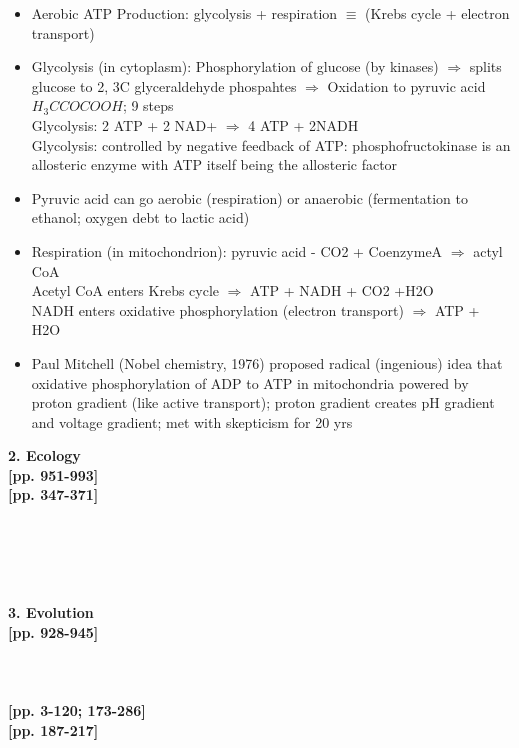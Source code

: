 \documentclass[12pt]{article}
\begin{document}
\begin{itemize}
	\item Aerobic ATP Production: glycolysis + respiration $ \equiv $ (Krebs cycle + electron transport)
	\item Glycolysis (in cytoplasm): Phosphorylation of glucose (by kinases)  $ \Rightarrow $ splits glucose to 2, 3C glyceraldehyde phospahtes $ \Rightarrow $  Oxidation to pyruvic acid $H_{3}CCOCOOH$; 9 steps \\
	Glycolysis: 2 ATP + 2 NAD+ $ \Rightarrow $ 4 ATP + 2NADH \\
	Glycolysis: controlled by negative feedback of ATP: phosphofructokinase is an allosteric enzyme with ATP itself being the allosteric factor
	\item Pyruvic acid can go aerobic (respiration) or anaerobic (fermentation to ethanol; oxygen debt to lactic acid)
	\item Respiration (in mitochondrion): pyruvic acid - CO2 + CoenzymeA  $\Rightarrow $ actyl CoA \\
	Acetyl CoA enters Krebs cycle $ \Rightarrow $ ATP + NADH + CO2 +H2O \\
	NADH enters oxidative phosphorylation (electron transport) $ \Rightarrow $ ATP + H2O
	\item Paul Mitchell (Nobel chemistry, 1976) proposed radical (ingenious) idea that oxidative phosphorylation of ADP to ATP in mitochondria powered by proton gradient (like active transport); proton gradient creates pH gradient and voltage gradient; met with skepticism for 20 yrs
\end{itemize}

\textbf{ 2. Ecology}\\
 \cite{curtis_biology_1983} \textbf{[pp. 951-993]}\\
 \cite{weier_botany:_1982} \textbf{[pp. 347-371]}\\
 \cite{odum_strategy_1969}\\
 \cite{hairston_community_1960}\\
 \cite{cardinale_biodiversity_2012}\\
 \cite {estes_trophic_2011}\\
 \cite{wiens_niche_2010}\\

\textbf{ 3. Evolution}\\
 \cite {curtis_biology_1983} \textbf{[pp. 928-945]}\\
 \cite{ehrlich_differentiation_1969}\\
 \cite{alleaume-benharira_geographical_2006}\\
 \cite{jay_gould_punctuated_1993}\\
 \cite{kauffman_origins_1993} \textbf{[pp. 3-120; 173-286]}\\
 \cite{beinhocker_origin_2007} \textbf{[pp. 187-217]}\\
 \cite{feng_epigenetic_2010}\\
\end{document}
